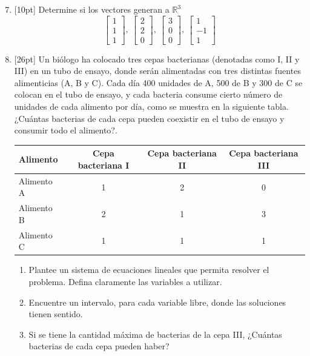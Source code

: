 \documentclass[11pt]{article}
\begin{document}
\begin{enumerate}
\setcounter{enumi}{6}
\item{}[10pt] Determine si los vectores generan a $\mathbb{R}^3$
\[
\begin{bmatrix}1\\1\\1\end{bmatrix},\ \begin{bmatrix}2\\2\\0\end{bmatrix},\ \begin{bmatrix}3\\0\\0\end{bmatrix},\ \begin{bmatrix}1\\-1\\1\end{bmatrix}
\]

\vspace{8cm}

\item{}[26pt] Un biólogo ha colocado tres cepas bacterianas (denotadas como I, II y III) en un tubo de ensayo, donde serán alimentadas con tres distintas fuentes alimenticias (A, B y C). Cada día 400 unidades de A, 500 de B y 300 de C se colocan en el tubo de ensayo, y cada bacteria consume cierto número de unidades de cada alimento por día, como se muestra en la siguiente tabla. ¿Cuántas bacterias de cada cepa pueden coexistir en el tubo de ensayo y consumir todo el alimento?.

\vspace{6pt}
\begin{center}
\begin{tabular}{|l|c|c|c|}
\hline
Alimento & Cepa bacteriana I & Cepa bacteriana II & Cepa bacteriana III \\ \hline
Alimento A & 1 & 2 & 0 \\ \hline
Alimento B & 2 & 1 & 3 \\ \hline
Alimento C & 1 & 1 & 1 \\ \hline
\end{tabular}
\end{center}

\begin{enumerate}
\item{} Plantee un sistema de ecuaciones lineales que permita resolver el problema. Defina claramente las variables a utilizar.
\item{} Encuentre un intervalo, para cada variable libre, donde las soluciones tienen sentido.
\item{} Si se tiene la cantidad máxima de bacterias de la cepa III, ¿Cuántas bacterias de cada cepa pueden haber?
\end{enumerate}


\end{enumerate}
\end{document}
